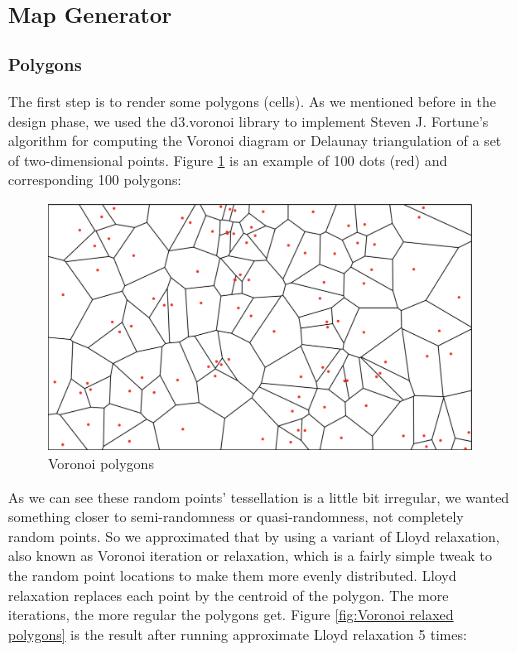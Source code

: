 \subsection{Map Generator}
\subsubsection{Polygons}
The first step is to render some polygons (cells). As we mentioned before in the design phase, we used the d3.voronoi library to implement Steven J. Fortune’s algorithm for computing the Voronoi diagram or Delaunay triangulation of a set of two-dimensional points. Figure \ref{fig:Voronoi polygons} is an example of 100 dots (red) and corresponding 100 polygons:

\begin{figure}[htbp]
\centering
\includegraphics[width=\textwidth]{section04/assets/Map-voronoi.png}
\caption[Voronoi polygons]{\label{fig:Voronoi polygons}Voronoi polygons}
\end{figure}

As we can see these random points' tessellation is a little bit irregular, we wanted something closer to semi-randomness or quasi-randomness, not completely random points. So we approximated that by using a variant of Lloyd relaxation, also known as Voronoi iteration or relaxation, which is a fairly simple tweak to the random point locations to make them more evenly distributed. Lloyd relaxation replaces each point by the centroid of the polygon. The more iterations, the more regular the polygons get. Figure \ref{fig:Voronoi relaxed polygons} is the result after running approximate Lloyd relaxation 5 times:

